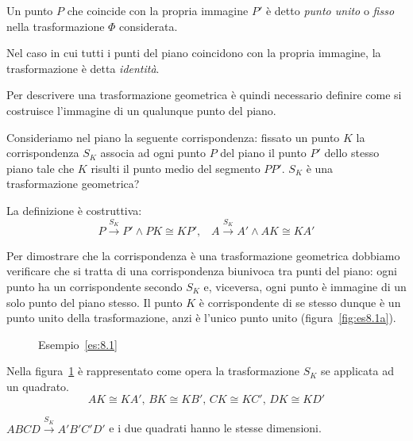 \begin{definizione}
Un punto \(P\) che coincide con la propria immagine \(P'\) è detto 
\emph{punto unito} o \emph{fisso} nella trasformazione \(\Phi\) 
considerata.
\end{definizione}

Nel caso in cui tutti i punti del piano coincidono con la propria 
immagine, la trasformazione è detta \emph{identità}.

Per descrivere una trasformazione geometrica è quindi necessario 
definire come si costruisce l'immagine di un qualunque punto del 
piano.

\begin{esempio}\label{es:8.1}
Consideriamo nel piano la seguente corrispondenza: fissato un punto 
\(K\) la corrispondenza \(S_K\) associa ad ogni punto \(P\) del piano il 
punto \(P'\) dello stesso piano tale che \(K\) risulti il punto medio del 
segmento \(PP'\). \(S_K\) è una trasformazione geometrica?\vspace{7pt}

La definizione è costruttiva:
\[P\overset{S_K}{\rightarrow}P' \wedge PK\cong KP'\text{,} \quad  
A\overset{S_K}{\rightarrow}A' \wedge AK\cong KA'\]

Per dimostrare che la corrispondenza è una trasformazione geometrica 
dobbiamo verificare che si tratta di una corrispondenza biunivoca tra 
punti del piano: ogni punto ha un corrispondente secondo \(S_K\) e, 
viceversa, ogni punto è immagine di un solo punto del piano stesso. 
Il punto \(K\) è corrispondente di se stesso dunque è un punto unito 
della trasformazione, anzi è l'unico punto unito 
(figura~\ref{fig:es8.1a}).

\begin{inaccessibleblock}
 \begin{figure}[!htb]
\begin{center}
 \noindent\begin{minipage}{0.4\textwidth}
    \centering
  \caption{Esempio~\ref{es:8.1}}\label{fig:es8.1a}
 \end{minipage}
 \noindent\begin{minipage}{0.4\textwidth}
    \centering
    \caption{Esempio~\ref{es:8.1}}\label{fig:es8.1b}
 \end{minipage}
\end{center}
\end{figure}
\end{inaccessibleblock}

Nella figura~\ref{fig:es8.1b} è rappresentato come opera la 
trasformazione \(S_K\) se applicata ad un quadrato.
\[AK\cong KA'\text{, }BK\cong KB'\text{, }CK\cong KC'\text{, }DK\cong 
KD'\]

\(ABCD\overset{S_K}{\rightarrow}A'B'C'D'\) e i due quadrati hanno le 
stesse dimensioni.
\end{esempio}

